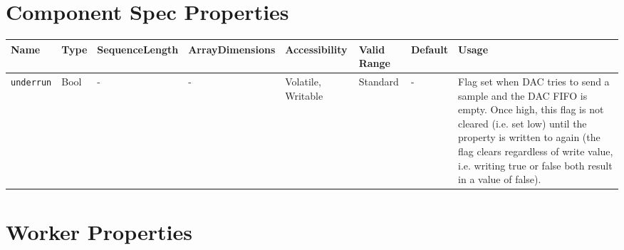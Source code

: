 \documentclass{article}
\begin{document}
\begin{landscape}

	\section*{Component Spec Properties}
	\begin{scriptsize}
		\begin{tabular}{|p{3.75cm}|p{1.25cm}|p{2cm}|p{2.75cm}|p{1.5cm}|p{1.5cm}|p{1cm}|p{6.62cm}|}
			\hline
			\rowcolor{blue}
			Name               & Type & SequenceLength & ArrayDimensions & Accessibility      & Valid Range & Default & Usage                                                                               \\
			\hline
			\verb+underrun+    & Bool & -              & -               & Volatile, Writable    & Standard    & -       & Flag set when DAC tries to send a sample and the DAC FIFO is empty. Once high, this flag is not cleared (i.e. set low) until the property is written to again (the flag clears regardless of write value, i.e. writing true or false both result in a value of false).\\
			\hline
		\end{tabular}
	\end{scriptsize}

	\section*{Worker Properties}

\end{landscape}
\end{document}
